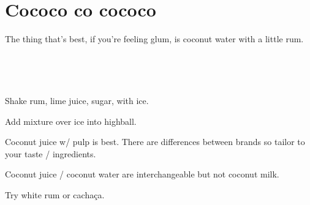 \section[Cococo co cococo]{Cococo co cococo~\vegan}


\begin{recipestats}[
	servings=1,
	preptime=5 \minute,
	source=Teresi Family,
]
\end{recipestats}


\begin{recipeabstract}
	The thing that's best, if you're feeling glum, is coconut water with a little rum.
\end{recipeabstract}


\begin{ingredientcolumns}
	\begin{ingredientblock}
		\\
	\end{ingredientblock}
	\begin{ingredientblock}
		\ingredient[2][\fluidounce]{spiced rum}\\
		\ingredient[1][\Tablespoon]{sugar}
	\end{ingredientblock}
\end{ingredientcolumns}


\begin{preparation}
\item Shake rum, lime juice, sugar, with ice.
\item Add mixture over ice into highball.
\end{preparation}


\begin{variation}
\item Coconut juice w/ pulp is best.
	There are differences between brands so tailor to your taste / ingredients.
\item Coconut juice / coconut water are interchangeable but not coconut milk.
\item Try white rum or cacha\c{c}a.
\end{variation}

\recipeend
